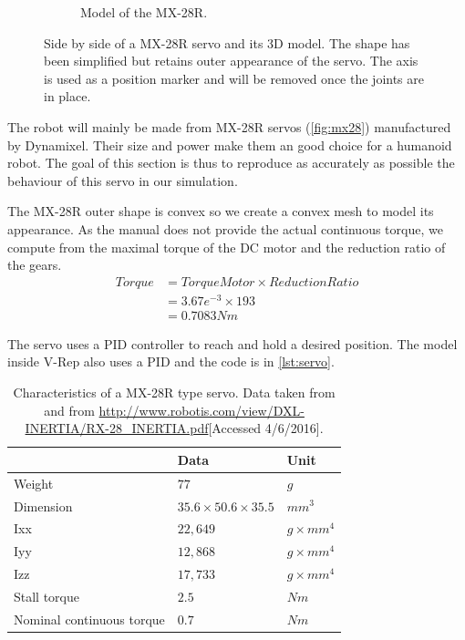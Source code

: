\begin{figure}[htp]
\begin{subfigure}[b]{0.3\textwidth}
    \caption{Model of the MX-28R.}
    \label{fig:mx28_model}
\end{subfigure}
\caption[Side by side of a MX-28R servo and its 3D model]{Side by side of a MX-28R servo and its 3D model. The shape has been simplified but retains outer appearance of the servo. The axis is used as a position marker and will be removed once the joints are in place.}
\label{fig:servo}
\end{figure}

The robot will mainly be made from MX-28R servos (\cref{fig:mx28}) manufactured by Dynamixel. Their size and power make them an good choice for a humanoid robot. The goal of this section is thus to reproduce as accurately as possible the behaviour of this servo in our simulation. 

The MX-28R outer shape is convex so we create a convex mesh to model its appearance. As the manual \cite{mx_28_manual} does not provide the actual continuous torque, we compute from the maximal torque of the DC motor and the reduction ratio of the gears. 
\begin{align*}
Torque &= TorqueMotor \times ReductionRatio\\
&= 3.67e^{-3} \times 193\\
&= 0.7083Nm
\end{align*}

The servo uses a PID controller to reach and hold a desired position. The model inside V-Rep also uses a PID and the code is in \cref{lst:servo}.

\begin{table}[htp]
\begin{tabularx}{\textwidth}{@{} l l X @{}}
\toprule
& \textbf{Data} & \textbf{Unit}\\ 
\midrule
Weight & $77$ & $g$\\
Dimension & $35.6 \times 50.6 \times 35.5$ & $mm^3$\\
Ixx & $22,649$ & $g \times mm^4$\\
Iyy & $12,868$ & $g \times mm^4$\\
Izz & $17,733$ & $g \times mm^4$ \\
Stall torque & $2.5$ & $Nm$\\
Nominal continuous torque & $0.7$ & $Nm$\\
\bottomrule
\end{tabularx}
\caption[]{Characteristics of a MX-28R type servo. Data taken from \cite{mx_28_manual} and from \url{http://www.robotis.com/view/DXL-INERTIA/RX-28_INERTIA.pdf}[Accessed 4/6/2016].}
\label{table:specs}
\end{table} 

